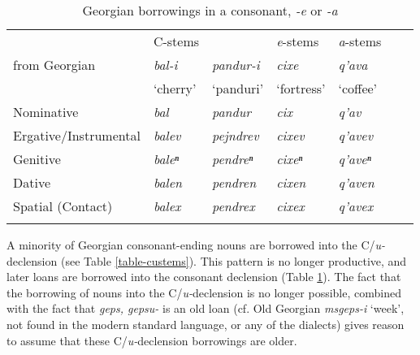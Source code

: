 \begin{table}
	\begin{tabular}{lllllll}
		\lsptoprule
	                  & {C-stems}  & & {\textit{e}-stems}  & {\textit{a}-stems} \\
		from Georgian & \textit{bal-i}  & \textit{pandur-i}  & \textit{cixe}  & \textit{q'ava}  \\
		              & `cherry' & `panduri' & `fortress' & `coffee'\\
		\midrule
		
		Nominative & \textit{bal} & \textit{pandur} & \textit{cix} & \textit{q'av} \\
		
		Ergative/Instrumental & \textit{balev} & \textit{pejndrev} & \textit{cixev} & \textit{q'avev} \\
		
		Genitive & \textit{baleⁿ} & \textit{pendreⁿ} & \textit{cixeⁿ} & \textit{q'aveⁿ} \\
		
		Dative & \textit{balen} & \textit{pendren} & \textit{cixen} & \textit{q'aven} \\
		
		Spatial (Contact) & \textit{balex} & \textit{pendrex} & \textit{cixex} & \textit{q'avex} \\
        \lspbottomrule
	\end{tabular}
	\caption{Georgian borrowings in a consonant, \textit{-e} or \textit{-a}}
	\label{table-cstemsgeo}
\end{table}

A minority of Georgian consonant-ending nouns are borrowed into the C/\textit{u-}declension (see Table \ref{table-custems}). This pattern is no longer productive, and later loans are borrowed into the consonant declension (Table \ref{table-cstemsgeo}). The fact that the borrowing of nouns into the C/\textit{u-}declension is no longer possible, combined with the fact that \textit{geps, gepsu-} is an old loan (cf. Old Georgian \textit{msgeps-i} `week', not found in the modern standard language, or any of the dialects) gives reason to assume that these C/\textit{u-}declension borrowings are older. 

